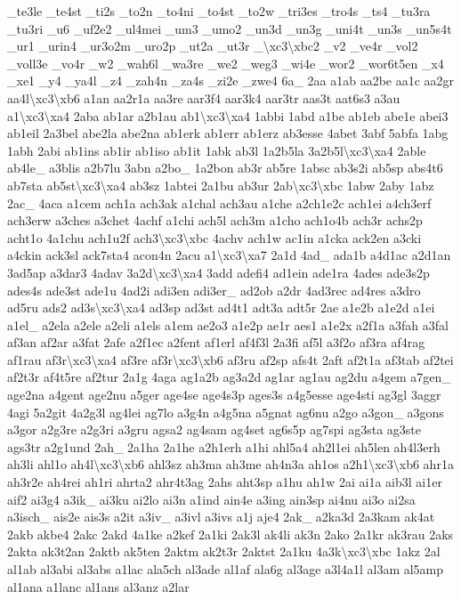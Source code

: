 {\-\_\-te3le \-\_\-te4st \-\_\-ti2s \-\_\-to2n \-\_\-to4ni \-\_\-to4st \-\_\-to2w \-\_\-tri3es \-\_\-tro4s \-\_\-ts4 \-\_\-tu3ra \-\_\-tu3ri \-\_\-u6 \-\_\-uf2e2 \-\_\-ul4mei \-\_\-um3 \-\_\-umo2 \-\_\-un3d \-\_\-un3g \-\_\-uni4t \-\_\-un3s \-\_\-un5s4t \-\_\-ur1 \-\_\-urin4 \-\_\-ur3o2m \-\_\-uro2p \-\_\-ut2a \-\_\-ut3r \-\_\-\textbackslash{}xc3\textbackslash{}xbc2 \-\_\-v2 \-\_\-ve4r \-\_\-vol2 \-\_\-voll3e \-\_\-vo4r \-\_\-w2 \-\_\-wah6l \-\_\-wa3re \-\_\-we2 \-\_\-weg3 \-\_\-wi4e \-\_\-wor2 \-\_\-wor6t5en \-\_\-x4 \-\_\-xe1 \-\_\-y4 \-\_\-ya4l \-\_\-z4 \-\_\-zah4n \-\_\-za4s \-\_\-zi2e \-\_\-zwe4 6a\-\_\- 2aa a1ab aa2be aa1c aa2gr aa4l\textbackslash{}xc3\textbackslash{}xb6 a1an aa2r1a aa3re aar3f4 aar3k4 aar3tr aas3t aat6s3 a3au a1\textbackslash{}xc3\textbackslash{}xa4 2aba ab1ar a2b1au ab1\textbackslash{}xc3\textbackslash{}xa4 1abbi 1abd a1be ab1eb abe1e abei3 ab1eil 2a3bel abe2la abe2na ab1erk ab1err ab1erz ab3esse 4abet 3abf 5abfa 1abg 1abh 2abi ab1ins ab1ir ab1iso ab1it 1abk ab3l 1a2b5la 3a2b5l\textbackslash{}xc3\textbackslash{}xa4 2able ab4le\-\_\- a3blis a2b7lu 3abn a2bo\-\_\- 1a2bon ab3r ab5re 1absc ab3s2i ab5sp abs4t6 ab7sta ab5st\textbackslash{}xc3\textbackslash{}xa4 ab3sz 1abtei 2a1bu ab3ur 2ab\textbackslash{}xc3\textbackslash{}xbc 1abw 2aby 1abz 2ac\-\_\- 4aca a1cem ach1a ach3ak a1chal ach3au a1che a2ch1e2c ach1ei a4ch3erf ach3erw a3ches a3chet 4achf a1chi ach5l ach3m a1cho ach1o4b ach3r achs2p acht1o 4a1chu ach1u2f ach3\textbackslash{}xc3\textbackslash{}xbc 4achv ach1w ac1in a1cka ack2en a3cki a4ckin ack3sl ack7sta4 acon4n 2acu a1\textbackslash{}xc3\textbackslash{}xa7 2a1d 4ad\-\_\- ada1b a4d1ac a2d1an 3ad5ap a3dar3 4adav 3a2d\textbackslash{}xc3\textbackslash{}xa4 3add adefi4 ad1ein ade1ra 4ades ade3s2p ades4s ade3st ade1u 4ad2i adi3en adi3er\-\_\- ad2ob a2dr 4ad3rec ad4res a3dro ad5ru ads2 ad3s\textbackslash{}xc3\textbackslash{}xa4 ad3sp ad3st ad4t1 adt3a adt5r 2ae a1e2b a1e2d a1ei a1el\-\_\- a2ela a2ele a2eli a1els a1em ae2o3 a1e2p ae1r aes1 a1e2x a2f1a a3fah a3fal af3an af2ar a3fat 2afe a2f1ec a2fent af1erl af4f3l 2a3fi af5l a3f2o af3ra af4rag af1rau af3r\textbackslash{}xc3\textbackslash{}xa4 af3re af3r\textbackslash{}xc3\textbackslash{}xb6 af3ru af2sp afs4t 2aft af2t1a af3tab af2tei af2t3r af4t5re af2tur 2a1g 4aga ag1a2b ag3a2d ag1ar ag1au ag2du a4gem a7gen\-\_\- age2na a4gent age2nu a5ger age4se age4s3p ages3s a4g5esse age4sti ag3gl 3aggr 4agi 5a2git 4a2g3l ag4lei ag7lo a3g4n a4g5na a5gnat ag6nu a2go a3gon\-\_\- a3gons a3gor a2g3re a2g3ri a3gru agsa2 ag4sam ag4set ag6s5p ag7spi ag3sta ag3ste ags3tr a2g1und 2ah\-\_\- 2a1ha 2a1he a2h1erh a1hi ahl5a4 ah2l1ei ah5len ah4l3erh ah3li ahl1o ah4l\textbackslash{}xc3\textbackslash{}xb6 ahl3sz ah3ma ah3me ah4n3a ah1os a2h1\textbackslash{}xc3\textbackslash{}xb6 ahr1a ah3r2e ah4rei ah1ri ahrta2 ahr4t3ag 2ahs aht3sp a1hu ah1w 2ai ai1a aib3l ai1er aif2 ai3g4 a3ik\-\_\- ai3ku ai2lo ai3n a1ind ain4e a3ing ain3sp ai4nu ai3o ai2sa a3isch\-\_\- ais2e ais3s a2it a3iv\-\_\- a3ivl a3ivs a1j aje4 2ak\-\_\- a2ka3d 2a3kam ak4at 2akb akbe4 2akc 2akd 4a1ke a2kef 2a1ki 2ak3l ak4li ak3n 2ako 2a1kr ak3rau 2aks 2akta ak3t2an 2aktb ak5ten 2aktm ak2t3r 2aktst 2a1ku 4a3k\textbackslash{}xc3\textbackslash{}xbc 1akz 2al al1ab al3abi al3abs a1lac ala5ch al3ade al1af ala6g al3age a3l4a1l al3am al5amp al1ana a1lanc al1ans al3anz a2lar }
